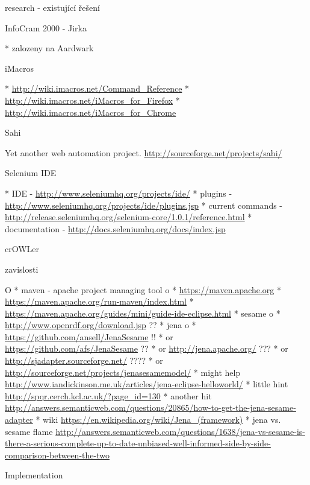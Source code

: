 \chap research - existující řešení


\sec InfoCram 2000 - Jirka

\begitems
  * zalozeny na Aardwark 
\enditems


\sec iMacros

\begitems
  * \url{http://wiki.imacros.net/Command_Reference}
  * \url{http://wiki.imacros.net/iMacros_for_Firefox}
  * \url{http://wiki.imacros.net/iMacros_for_Chrome}
\enditems


\sec Sahi

Yet another web automation project. \url{http://sourceforge.net/projects/sahi/}


\sec Selenium IDE

\begitems
  * IDE - \url{http://www.seleniumhq.org/projects/ide/}
  * plugins - \url{http://www.seleniumhq.org/projects/ide/plugins.jsp}
  * current commands - \url{http://release.seleniumhq.org/selenium-core/1.0.1/reference.html}
  * documentation - \url{http://docs.seleniumhq.org/docs/index.jsp}
\enditems






\chap crOWLer

\sec zavislosti

\begitems \style O
  * maven - apache project managing tool
  \begitems \style o
    * \url{https://maven.apache.org}
    * \url{https://maven.apache.org/run-maven/index.html}
    * \url{https://maven.apache.org/guides/mini/guide-ide-eclipse.html}
  \enditems
  * sesame
  \begitems \style o
    * \url{http://www.openrdf.org/download.jsp} ??
  \enditems
  * jena
  \begitems \style o
    * \url{https://github.com/ansell/JenaSesame} !!
    * or \url{https://github.com/afs/JenaSesame} ??
    * or \url{http://jena.apache.org/} ???
    * or \url{http://sjadapter.sourceforge.net/} ????
    * or \url{http://sourceforge.net/projects/jenasesamemodel/}
    * might help \url{http://www.iandickinson.me.uk/articles/jena-eclipse-helloworld/}
    * little hint \url{http://spqr.cerch.kcl.ac.uk/?page_id=130}
    * another hit \url{http://answers.semanticweb.com/questions/20865/how-to-get-the-jena-sesame-adapter}
    * wiki \url{https://en.wikipedia.org/wiki/Jena_(framework)}
    * jena vs. sesame flame \url{http://answers.semanticweb.com/questions/1638/jena-vs-sesame-is-there-a-serious-complete-up-to-date-unbiased-well-informed-side-by-side-comparison-between-the-two}
  \enditems
\enditems

\sec Implementation

